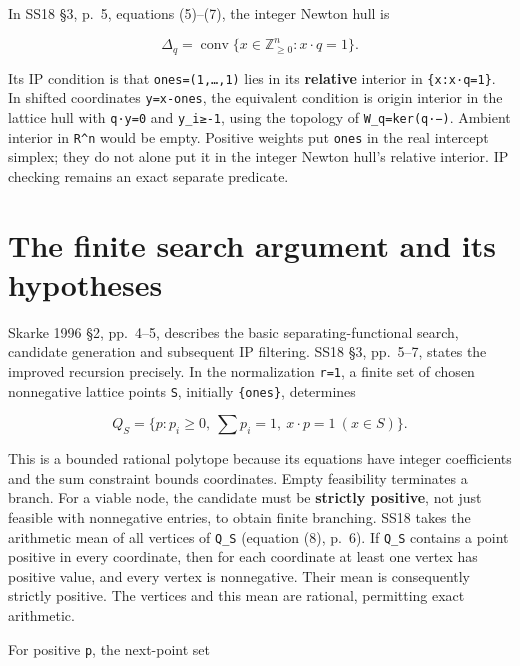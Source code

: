 \documentclass[11pt,a4paper,oneside]{report}
\begin{document}
In SS18 §3, p.~5, equations (5)--(7), the integer Newton hull is

\[
\Delta_q=\operatorname{conv}\{x\in\mathbb Z_{\ge0}^n:x\cdot q=1\}.
\]

Its IP condition is that
\texttt{ones=\allowbreak{}(\allowbreak{}1,\allowbreak{}…,\allowbreak{}1)}
lies in its \textbf{relative} interior in
\texttt{\{x:\allowbreak{}x·q=\allowbreak{}1\}}. In shifted coordinates
\texttt{y=\allowbreak{}x-\allowbreak{}ones}, the equivalent condition is
origin interior in the lattice hull with \texttt{q·y=\allowbreak{}0} and
\texttt{y\_\allowbreak{}i≥-\allowbreak{}1}, using the topology of
\texttt{W\_\allowbreak{}q=\allowbreak{}ker(\allowbreak{}q·−)}. Ambient
interior in \texttt{R\textasciicircum{}n} would be empty. Positive
weights put \texttt{ones} in the real intercept simplex; they do not
alone put it in the integer Newton hull's relative interior. IP checking
remains an exact separate predicate.

\section{The finite search argument and its
hypotheses}\label{weight-enumeration-and-degree-bounds--the-finite-search-argument-and-its-hypotheses}

Skarke 1996 §2, pp.~4--5, describes the basic separating-functional
search, candidate generation and subsequent IP filtering. SS18 §3,
pp.~5--7, states the improved recursion precisely. In the normalization
\texttt{r=\allowbreak{}1}, a finite set of chosen nonnegative lattice
points \texttt{S}, initially \texttt{\{ones\}}, determines

\[
Q_S=\{p:p_i\ge0,\ \sum p_i=1,\ x\cdot p=1\ (x\in S)\}.
\]

This is a bounded rational polytope because its equations have integer
coefficients and the sum constraint bounds coordinates. Empty
feasibility terminates a branch. For a viable node, the candidate must
be \textbf{strictly positive}, not just feasible with nonnegative
entries, to obtain finite branching. SS18 takes the arithmetic mean of
all vertices of \texttt{Q\_\allowbreak{}S} (equation (8), p.~6). If
\texttt{Q\_\allowbreak{}S} contains a point positive in every
coordinate, then for each coordinate at least one vertex has positive
value, and every vertex is nonnegative. Their mean is consequently
strictly positive. The vertices and this mean are rational, permitting
exact arithmetic.

For positive \texttt{p}, the next-point set
\end{document}
